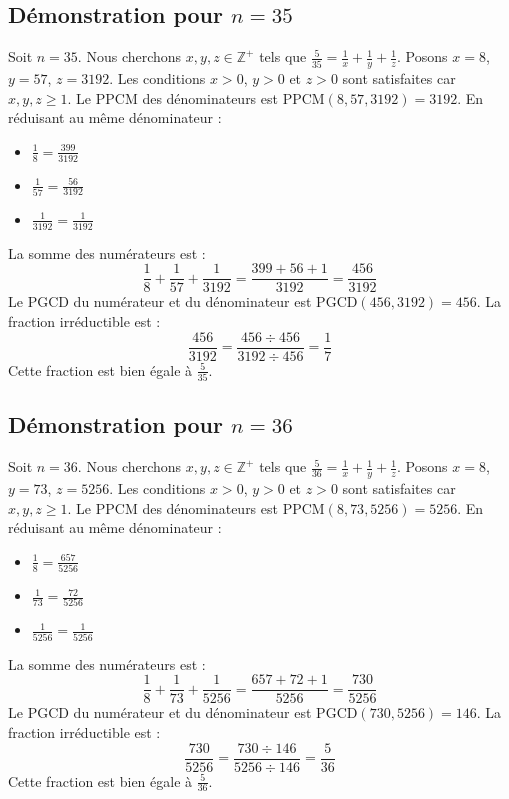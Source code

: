 \documentclass[11pt,a4paper]{article}
\begin{document}
\subsection{Démonstration pour $n = 35$}
Soit $n = 35$. Nous cherchons $x, y, z \in \mathbb{Z}^{+}$ tels que $\frac{5}{35} = \frac{1}{x} + \frac{1}{y} + \frac{1}{z}$.
Posons $x = 8$, $y = 57$, $z = 3192$.
Les conditions $x > 0$, $y > 0$ et $z > 0$ sont satisfaites car $x, y, z \geq 1$.
Le PPCM des dénominateurs est $\text{PPCM}(8, 57, 3192) = 3192$.
En réduisant au même dénominateur :
\begin{itemize}
    \item $\frac{1}{8} = \frac{399}{3192}$
    \item $\frac{1}{57} = \frac{56}{3192}$
    \item $\frac{1}{3192} = \frac{1}{3192}$
\end{itemize}
La somme des numérateurs est :
$$ \frac{1}{8} + \frac{1}{57} + \frac{1}{3192} = \frac{399 + 56 + 1}{3192} = \frac{456}{3192} $$
Le PGCD du numérateur et du dénominateur est $\text{PGCD}(456, 3192) = 456$.
La fraction irréductible est :
$$ \frac{456}{3192} = \frac{456 \div 456}{3192 \div 456} = \frac{1}{7} $$
Cette fraction est bien égale à $\frac{5}{35}$.

\subsection{Démonstration pour $n = 36$}
Soit $n = 36$. Nous cherchons $x, y, z \in \mathbb{Z}^{+}$ tels que $\frac{5}{36} = \frac{1}{x} + \frac{1}{y} + \frac{1}{z}$.
Posons $x = 8$, $y = 73$, $z = 5256$.
Les conditions $x > 0$, $y > 0$ et $z > 0$ sont satisfaites car $x, y, z \geq 1$.
Le PPCM des dénominateurs est $\text{PPCM}(8, 73, 5256) = 5256$.
En réduisant au même dénominateur :
\begin{itemize}
    \item $\frac{1}{8} = \frac{657}{5256}$
    \item $\frac{1}{73} = \frac{72}{5256}$
    \item $\frac{1}{5256} = \frac{1}{5256}$
\end{itemize}
La somme des numérateurs est :
$$ \frac{1}{8} + \frac{1}{73} + \frac{1}{5256} = \frac{657 + 72 + 1}{5256} = \frac{730}{5256} $$
Le PGCD du numérateur et du dénominateur est $\text{PGCD}(730, 5256) = 146$.
La fraction irréductible est :
$$ \frac{730}{5256} = \frac{730 \div 146}{5256 \div 146} = \frac{5}{36} $$
Cette fraction est bien égale à $\frac{5}{36}$.
\end{document}
